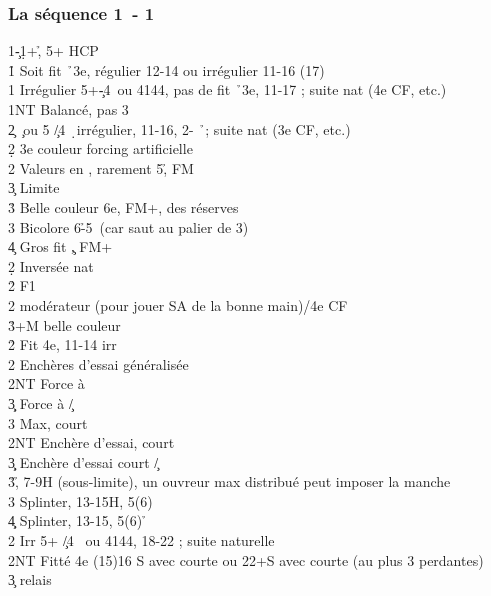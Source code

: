 \documentclass[a4paper]{article}
\begin{document}
\subsubsection{La séquence 1\pdfc\ - 1\pdfd}

\begin{bidtable}
1\c-1\d {}+\h , 5+ HCP\\
1\h \> Soit fit \h\ 3e, régulier 12-14 ou irrégulier 11-16 (17)\\
1\s \> Irrégulier 5+\c -4\s\ ou 4144, pas de fit \h\ 3e, 11-17 ; suite nat (4e CF, etc.)\\
1NT \> Balancé, pas 3\h \\
2\c {} \c\ ou 5 \c /4 \d\ irrégulier, 11-16, 2- \h\ ; suite nat (3e CF, etc.)\+\\
2\d \> 3e couleur forcing artificielle\\
2\s \> Valeurs en \s , rarement 5\h , FM\\
3\c \> Limite\\
3\h \> Belle couleur 6e, FM+, des réserves\\
3\s \> Bicolore 6\h -5\s\ (car saut au palier de 3)\\
4\c \> Gros fit \c , FM+\-\\
2\d \> Inversée nat\+\\
2\h \> F1\\
2\s \> modérateur (pour jouer SA de la bonne main)/4e CF\\
3\h {}+M belle couleur\-\\
2\h \> Fit 4e, 11-14 irr\+\\
2\s \> Enchères d'essai généralisée\+\\
2NT \> Force à \s \\
3\c\d \> Force à \c /\d \\
3\s \> Max, court \s \-\\
2NT \> Enchère d'essai, court \s \\
3\c\d \> Enchère d'essai court \c /\d \\
3\h {}\h , 7-9H (sous-limite), un ouvreur max distribué peut imposer la manche\\
3\s \> Splinter, 13-15H, 5(6) \h \\
4\c\d \> Splinter, 13-15, 5(6) \h \-\\
2\s \> Irr 5+ \c /4 \s\ ou 4144, 18-22 ; suite naturelle\\
2NT \> Fitté 4e (15)16 S avec courte ou 22+S avec courte (au plus 3 perdantes)\+\\
3\c \> relais\+\\

\end{bidtable}
\end{document}
